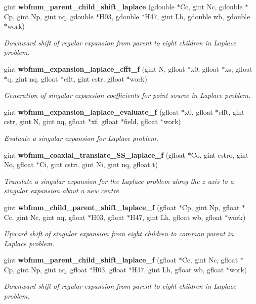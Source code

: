 \begin{DoxyCompactItemize}
gint {\bf wbfmm\+\_\+parent\+\_\+child\+\_\+shift\+\_\+laplace} (gdouble $\ast$Cc, gint Nc, gdouble $\ast$Cp, gint Np, gint nq, gdouble $\ast$H03, gdouble $\ast$H47, gint Lh, gdouble wb, gdouble $\ast$work)
\begin{DoxyCompactList}\small\item\em Downward shift of regular expansion from parent to eight children in Laplace problem. \end{DoxyCompactList}\item 
gint {\bf wbfmm\+\_\+expansion\+\_\+laplace\+\_\+cfft\+\_\+f} (gint N, gfloat $\ast$x0, gfloat $\ast$xs, gfloat $\ast$q, gint nq, gfloat $\ast$cfft, gint cstr, gfloat $\ast$work)
\begin{DoxyCompactList}\small\item\em Generation of singular expansion coefficients for point source in Laplace problem. \end{DoxyCompactList}\item 
gint {\bf wbfmm\+\_\+expansion\+\_\+laplace\+\_\+evaluate\+\_\+f} (gfloat $\ast$x0, gfloat $\ast$cfft, gint cstr, gint N, gint nq, gfloat $\ast$xf, gfloat $\ast$field, gfloat $\ast$work)
\begin{DoxyCompactList}\small\item\em Evaluate a singular expansion for Laplace problem. \end{DoxyCompactList}\item 
gint {\bf wbfmm\+\_\+coaxial\+\_\+translate\+\_\+\+S\+S\+\_\+laplace\+\_\+f} (gfloat $\ast$Co, gint cstro, gint No, gfloat $\ast$Ci, gint cstri, gint Ni, gint nq, gfloat t)
\begin{DoxyCompactList}\small\item\em Translate a singular expansion for the Laplace problem along the $z$ axis to a singular expansion about a new centre. \end{DoxyCompactList}\item 
gint {\bf wbfmm\+\_\+child\+\_\+parent\+\_\+shift\+\_\+laplace\+\_\+f} (gfloat $\ast$Cp, gint Np, gfloat $\ast$Cc, gint Nc, gint nq, gfloat $\ast$H03, gfloat $\ast$H47, gint Lh, gfloat wb, gfloat $\ast$work)
\begin{DoxyCompactList}\small\item\em Upward shift of singular expansion from eight children to common parent in Laplace problem. \end{DoxyCompactList}\item 
gint {\bf wbfmm\+\_\+parent\+\_\+child\+\_\+shift\+\_\+laplace\+\_\+f} (gfloat $\ast$Cc, gint Nc, gfloat $\ast$Cp, gint Np, gint nq, gfloat $\ast$H03, gfloat $\ast$H47, gint Lh, gfloat wb, gfloat $\ast$work)
\begin{DoxyCompactList}\small\item\em Downward shift of regular expansion from parent to eight children in Laplace problem. \end{DoxyCompactList}\end{DoxyCompactItemize}


